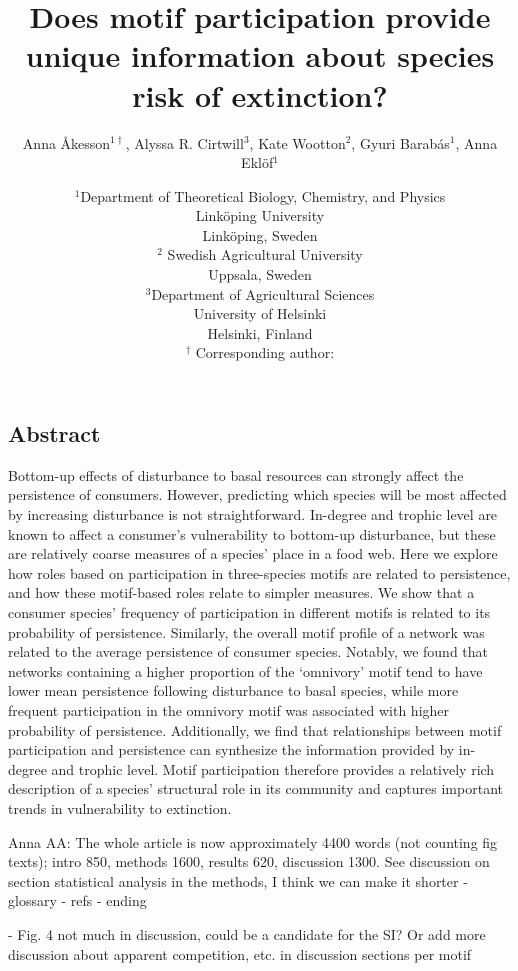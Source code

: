 \documentclass[12pt]{article}
\title{Does motif participation provide unique information about species risk of extinction?}
\author{Anna \r{A}kesson$^{1\dagger}$, Alyssa R. Cirtwill$^{3}$, Kate Wootton$^{2}$, Gyuri Barab\'{a}s$^{1}$, Anna Ekl\"{o}f$^{1}$}
\date{\small$^1$Department of Theoretical Biology, Chemistry, and Physics\\ 
Link\"{o}ping University\\
Link\"{o}ping, Sweden\\
\medskip
\small$^2$ Swedish Agricultural University\\
Uppsala, Sweden\\
\medskip
\small$^3$Department of Agricultural Sciences\\
University of Helsinki\\
Helsinki, Finland\\
\medskip
$^\dagger$ Corresponding author:\\
}
\begin{document}
 
\maketitle 
\raggedright

\setlength{\parindent}{15pt} 
\begin{spacing}{2.0}


\section*{Abstract}
    Bottom-up effects of disturbance to basal resources can strongly affect the persistence of consumers.
    However, predicting which species will be most affected by increasing disturbance is not straightforward.
    In-degree and trophic level are known to affect a consumer's vulnerability to bottom-up disturbance, but these are relatively coarse measures of a species' place in a food web.
    Here we explore how roles based on participation in three-species motifs are related to persistence, and how these motif-based roles relate to simpler measures.
    We show that a consumer species' frequency of participation in different motifs is related to its probability of persistence. Similarly, the overall motif profile of a network was related to the average persistence of consumer species.
    Notably, we found that networks containing a higher proportion of the `omnivory' motif tend to have lower mean persistence following disturbance to basal species, while more frequent participation in the omnivory motif was associated with higher probability of persistence.
    Additionally, we find that relationships between motif participation and persistence can synthesize the information provided by in-degree and trophic level.
    Motif participation therefore provides a relatively rich description of a species' structural role in its community and captures important trends in vulnerability to extinction.

    

    Anna AA: The whole article is now approximately 4400 words (not counting fig texts); intro 850, methods 1600, results 620, discussion 1300. See discussion on section statistical analysis in the methods, I think we can make it shorter
    - glossary
    - refs
    - ending


    - Fig. 4 not much in discussion, could be a candidate for the SI? Or add more discussion about apparent competition, etc. in discussion sections per motif


\end{spacing}
\end{document}
